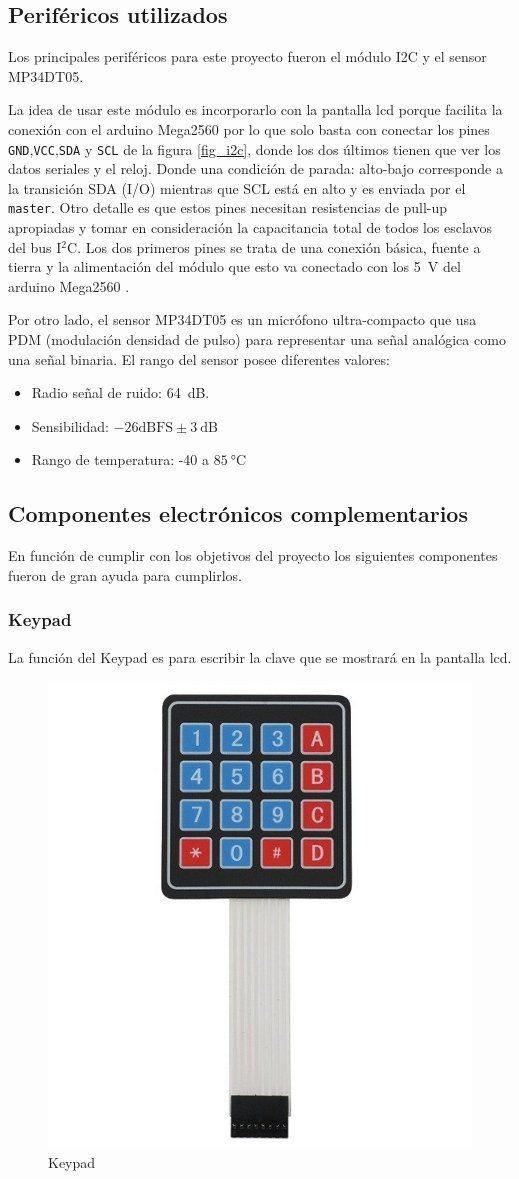 \subsection*{Periféricos utilizados}
Los principales periféricos para este proyecto fueron el módulo I2C y el sensor MP34DT05.\par
La idea de usar este módulo es incorporarlo con la pantalla lcd porque facilita la conexión con el arduino Mega2560 por lo que solo basta con conectar los pines \texttt{GND},\texttt{VCC},\texttt{SDA} y \texttt{SCL} de la figura \ref{fig_i2c}, donde los dos últimos tienen que ver los datos seriales y el reloj. Donde una condición de parada: alto-bajo corresponde a la transición SDA (I/O) mientras que SCL está en alto y es enviada por el \texttt{master}. Otro detalle es que estos pines necesitan resistencias de pull-up apropiadas y tomar en consideración la capacitancia total de todos los esclavos del bus I$^2$C. Los dos primeros pines se trata de una conexión básica, fuente a tierra y la alimentación del módulo que esto va conectado con los \SI{5}{\volt} del arduino Mega2560 \cite{web8}.\par
Por otro lado, el sensor MP34DT05 es un micrófono ultra-compacto que usa PDM (modulación densidad de pulso) para representar una señal analógica como una señal binaria. El rango del sensor posee diferentes valores:
\begin{itemize}
    \item Radio señal de ruido: \SI{64}{\dB}.
    \item Sensibilidad: $-26\text{dBFS} \pm \SI{3}{\dB} $
    \item Rango de temperatura: -40 a $\SI{85}{\celsius}$
\end{itemize}

\subsection*{Componentes electrónicos complementarios}
En función de cumplir con los objetivos del proyecto los siguientes componentes fueron de gran ayuda para cumplirlos.
\subsubsection*{Keypad}
La función del Keypad es para escribir la clave que se mostrará en la pantalla lcd.
\begin{figure}[H]
    \centering
    \includegraphics[width=.4\linewidth]{Img/keypad.jpg}
    \caption{Keypad}
    \label{fig_keypad}
\end{figure}
